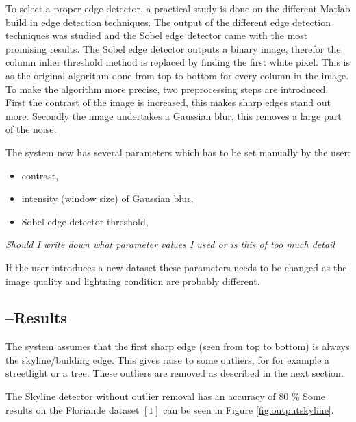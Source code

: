 \documentclass[10pt]{article}
\begin{document}
To select a proper edge detector, a practical study is done on the different
Matlab build in edge detection techniques. The output of the different edge
detection techniques was studied and the Sobel edge detector came with the most
promising results. The Sobel edge detector outputs a binary image, therefor the column inlier
threshold method is replaced by finding the first white pixel. This is as the
original algorithm done from top to bottom for every column in the image.
\\ 
To make the algorithm more precise, two preprocessing
steps are introduced. First the contrast of the image is increased, this makes
sharp edges stand out more.  Secondly the image undertakes a Gaussian blur,
this removes a large part of the noise.

The system now has several parameters which has to be set manually by the user:
\begin{itemize}
	\item contrast,
	\item intensity (window size) of Gaussian blur,
	\item Sobel edge detector threshold,
\end{itemize}
\textit{Should I write down what parameter values I used or is this of too much
detail}

If the user introduces a new dataset these parameters needs to be changed
as the image quality and lightning condition are probably different.

 \subsection{--Results}%
The system assumes that the first sharp edge (seen from top to bottom) is
always the skyline/building edge. This gives raise to some outliers, for 
for example a streetlight or a tree. These outliers are removed as described in
the next section.  

The Skyline detector without outlier removal has an accuracy of 80 \% 
Some results on the Floriande dataset $[1]$ can be seen in Figure \ref{fig:outputskyline}.

\end{document}
